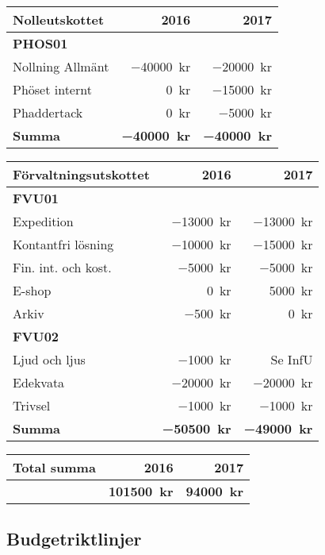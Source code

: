 \documentclass[10pt]{article}
\begin{document}
\begin{tabularx}{10cm}{X r r}
    \textbf{\large Nolleutskottet} & \textbf{2016} & \textbf{2017} \\
    \hline
    \textbf{PHOS01} \\
    Nollning Allmänt & \SI{-40000}{kr} & \SI{-20000}{kr} \\
    Phöset internt & \SI{0}{kr} & \SI{-15000}{kr} \\
    Phaddertack & \SI{0}{kr} & \SI{-5000}{kr} \\
    \hline
    \textbf{Summa} & \textbf{\SI{-40000}{kr}} & \textbf{\SI{-40000}{kr}} \\
\end{tabularx}

\begin{tabularx}{9cm}{X r r}
    \textbf{\large Förvaltningsutskottet} & \textbf{2016} & \textbf{2017} \\
    \hline
    \textbf{FVU01} \\
    Expedition & \SI{-13000}{kr} & \SI{-13000}{kr} \\
    Kontantfri lösning & \SI{-10000}{kr} & \SI{-15000}{kr} \\
    Fin. int. och kost. & \SI{-5000}{kr} & \SI{-5000}{kr} \\
    E-shop & \SI{0}{kr} & \SI{5000}{kr} \\
    Arkiv & \SI{-500}{kr} & \SI{0}{kr} \\
    \textbf{FVU02} \\
    Ljud och ljus & \SI{-1000}{kr} & Se InfU \\
    Edekvata & \SI{-20000}{kr} & \SI{-20000}{kr} \\
    Trivsel & \SI{-1000}{kr} & \SI{-1000}{kr} \\
    \hline
    \textbf{Summa} & \textbf{\SI{-50500}{kr}} & \textbf{\SI{-49000}{kr}} \\
\end{tabularx}

\begin{tabularx}{9cm}{X r r}
    \textbf{\large Total summa} & \textbf{2016} & \textbf{2017} \\
    \hline
     & \textbf{\SI{101500}{kr}} & \textbf{\SI{94000}{kr}} \\
\end{tabularx}


\newpage
\subsection*{Budgetriktlinjer}
\end{document}
